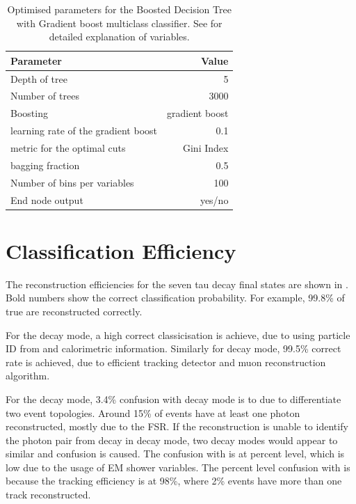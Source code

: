 \begin{table}[!tbp]\centering
\begin{tabular}{lr}
\hline \hline
 Parameter &  Value \\
\hline
Depth of tree & 5 \\
Number of trees & 3000 \\
Boosting & gradient boost \\
learning rate of the gradient boost & 0.1 \\
metric for the optimal cuts & Gini Index \\
bagging fraction & 0.5 \\
Number of bins per variables & 100 \\
End node output & yes/no \\
\hline \hline
\end{tabular}

\caption
{Optimised parameters for the Boosted Decision Tree with Gradient boost multiclass classifier. See  for detailed explanation of variables.}
\label{tab:tauBDTparameters}
\end{table}


\section{Classification Efficiency}

The reconstruction efficiencies for the seven tau decay final states are shown in . Bold numbers show the correct classification probability. For example, 99.8\%  of true \decayElectronShort are reconstructed correctly.

For the \decayElectronShort decay mode, a high correct classicisation is achieve, due to using particle ID from \pandora and calorimetric information. Similarly for \decayMuonShort decay mode,  99.5\% correct rate is achieved, due to efficient tracking detector and muon reconstruction algorithm.

For the \decayPionShort decay mode, 3.4\% confusion with \decayRhoShortest decay mode  is to due to differentiate two event topologies. Around 15\% of \decayPionShort events have at least one photon reconstructed, mostly due to the FSR. If the reconstruction is unable to identify the photon pair from \Ppizero decay in \decayRhoShortest decay mode, two decay modes would appear to  similar and confusion is caused. The confusion with \decayElectronShort is at percent level, which is low due to the usage of EM shower variables. The percent level confusion with \decayAiPionShortest is because the tracking efficiency is at 98\%, where 2\% \decayPionShort events have more than one track reconstructed.

